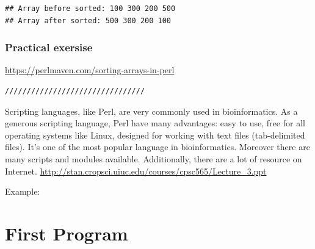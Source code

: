 \documentclass[]{book}
\makeatletter
\newenvironment{Shaded}{\begin{snugshade}}{\end{snugshade}}
\newcommand{\KeywordTok}[1]{\textcolor[rgb]{0.13,0.29,0.53}{\textbf{#1}}}
\newcommand{\DataTypeTok}[1]{\textcolor[rgb]{0.13,0.29,0.53}{#1}}
\newcommand{\DecValTok}[1]{\textcolor[rgb]{0.00,0.00,0.81}{#1}}
\newcommand{\CharTok}[1]{\textcolor[rgb]{0.31,0.60,0.02}{#1}}
\newcommand{\StringTok}[1]{\textcolor[rgb]{0.31,0.60,0.02}{#1}}
\newcommand{\CommentTok}[1]{\textcolor[rgb]{0.56,0.35,0.01}{\textit{#1}}}
\newcommand{\FunctionTok}[1]{\textcolor[rgb]{0.00,0.00,0.00}{#1}}
\newcommand{\NormalTok}[1]{#1}
\newenvironment{kframe}{%
\medskip{}
\setlength{\fboxsep}{.8em}
 \def\at@end@of@kframe{}%
 \ifinner\ifhmode%
  \def\at@end@of@kframe{\end{minipage}}%
  \begin{minipage}{\columnwidth}%
 \fi\fi%
 \def\FrameCommand##1{\hskip\@totalleftmargin \hskip-\fboxsep
 \colorbox{shadecolor}{##1}\hskip-\fboxsep
     \hskip-\linewidth \hskip-\@totalleftmargin \hskip\columnwidth}%
 \MakeFramed {\advance\hsize-\width
   \@totalleftmargin\z@ \linewidth\hsize
   \@setminipage}}%
 {\par\unskip\endMakeFramed%
 \at@end@of@kframe}
\renewenvironment{Shaded}{\begin{kframe}}{\end{kframe}}
\theoremstyle{definition}
\theoremstyle{definition}
\theoremstyle{definition}
\theoremstyle{remark}
\makeatother
\begin{document}
\begin{Shaded}
\end{Shaded}

\begin{verbatim}
## Array before sorted: 100 300 200 500
## Array after sorted: 500 300 200 100
\end{verbatim}

\subsubsection{Practical exersise}\label{practical-exersise}

\url{https://perlmaven.com/sorting-arrays-in-perl}

\begin{verbatim}
////////////////////////////////
\end{verbatim}

Scripting languages, like Perl, are very commonly used in
bioinformatics. As a generous scripting language, Perl have many
advantages: easy to use, free for all operating systems like Linux,
designed for working with text files (tab-delimited files). It's one of
the most popular language in bioinformatics. Moreover there are many
scripts and modules available. Additionally, there are a lot of resource
on Internet.
\url{http://stan.cropsci.uiuc.edu/courses/cpsc565/Lecture_3.ppt}

Example: \citet{DeitelPerl}

\section{First Program}\label{first-program-1}
\end{document}
